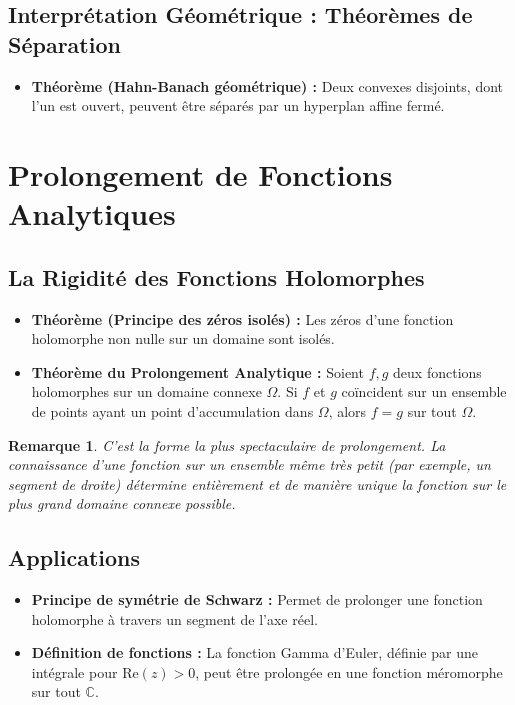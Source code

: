 \documentclass[12pt, a4paper, parskip=full]{report}
\theoremstyle{agregstyle}
\newtheorem{remark}[definition]{Remarque}
\begin{document}
\subsection{Interprétation Géométrique : Théorèmes de Séparation}
\begin{itemize}
    \item \textbf{Théorème (Hahn-Banach géométrique) :} Deux convexes disjoints, dont l'un est ouvert, peuvent être séparés par un hyperplan affine fermé.
\end{itemize}

\section{Prolongement de Fonctions Analytiques}
\subsection{La Rigidité des Fonctions Holomorphes}
\begin{itemize}
    \item \textbf{Théorème (Principe des zéros isolés) :} Les zéros d'une fonction holomorphe non nulle sur un domaine sont isolés.
    \item \textbf{Théorème du Prolongement Analytique :} Soient $f,g$ deux fonctions holomorphes sur un domaine connexe $\Omega$. Si $f$ et $g$ coïncident sur un ensemble de points ayant un point d'accumulation dans $\Omega$, alors $f=g$ sur tout $\Omega$.
\end{itemize}
\begin{remark}
    C'est la forme la plus spectaculaire de prolongement. La connaissance d'une fonction sur un ensemble même très petit (par exemple, un segment de droite) détermine entièrement et de manière unique la fonction sur le plus grand domaine connexe possible.
\end{remark}
\subsection{Applications}
\begin{itemize}
    \item \textbf{Principe de symétrie de Schwarz :} Permet de prolonger une fonction holomorphe à travers un segment de l'axe réel.
    \item \textbf{Définition de fonctions :} La fonction Gamma d'Euler, définie par une intégrale pour $\mathrm{Re}(z)>0$, peut être prolongée en une fonction méromorphe sur tout $\mathbb{C}$.
\end{itemize}
\end{document}
